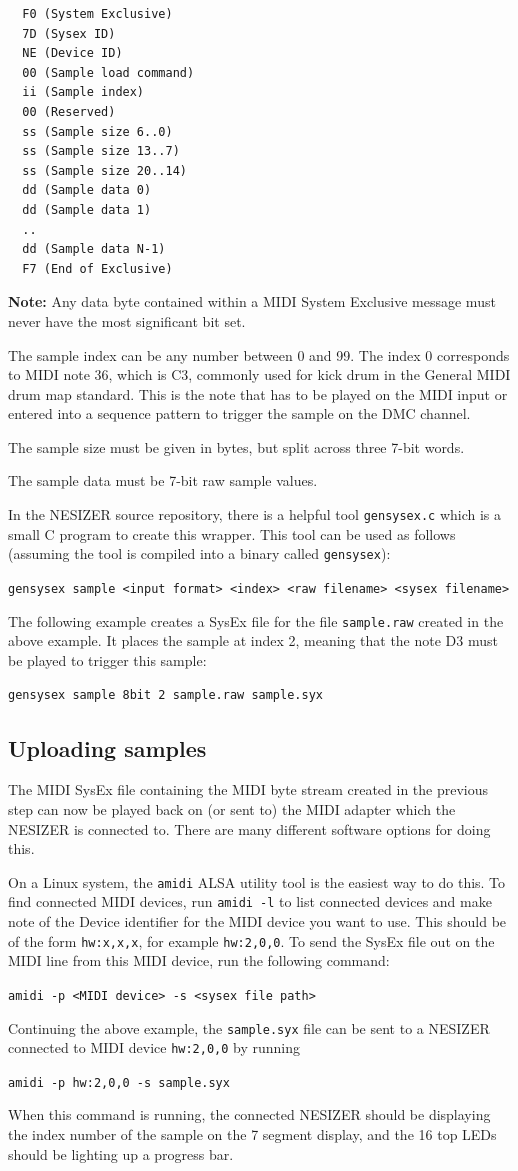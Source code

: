 \documentclass[a4paper, 12p]{extarticle}
\begin{document}
\begin{verbatim}
  F0 (System Exclusive)
  7D (Sysex ID)
  NE (Device ID)
  00 (Sample load command)
  ii (Sample index)
  00 (Reserved)
  ss (Sample size 6..0)
  ss (Sample size 13..7)
  ss (Sample size 20..14)
  dd (Sample data 0)
  dd (Sample data 1)
  ..
  dd (Sample data N-1)
  F7 (End of Exclusive)
\end{verbatim}

\textbf{Note:} Any data byte contained within a MIDI System Exclusive message must never have the most significant bit set.

The sample index can be any number between 0 and 99. The index 0 corresponds to MIDI note 36, which is C3, commonly used for kick drum in the General MIDI drum map standard. This is the note that has to be played on the MIDI input or entered into a sequence pattern to trigger the sample on the DMC channel.

The sample size must be given in bytes, but split across three 7-bit words.

The sample data must be 7-bit raw sample values.

In the NESIZER source repository, there is a helpful tool \verb+gensysex.c+ which is a small C program to create this wrapper. This tool can be used as follows (assuming the tool is compiled into a binary called \verb+gensysex+):

\verb+gensysex sample <input format> <index> <raw filename> <sysex filename>+

The following example creates a SysEx file for the file \verb+sample.raw+ created in the above example. It places the sample at index 2, meaning that the note D3 must be played to trigger this sample:

\verb+gensysex sample 8bit 2 sample.raw sample.syx+

\subsection{Uploading samples}
The MIDI SysEx file containing the MIDI byte stream created in the previous step can now be played back on (or sent to) the MIDI adapter which the NESIZER is connected to. There are many different software options for doing this.

On a Linux system, the \verb+amidi+ ALSA utility tool is the easiest way to do this. To find connected MIDI devices, run \verb+amidi -l+ to list connected devices and make note of the Device identifier for the MIDI device you want to use. This should be of the form \verb+hw:x,x,x+, for example \verb+hw:2,0,0+.
To send the SysEx file out on the MIDI line from this MIDI device, run the following command:

\verb+amidi -p <MIDI device> -s <sysex file path>+

Continuing the above example, the \verb+sample.syx+ file can be sent to a NESIZER connected to MIDI device \verb+hw:2,0,0+ by running

\verb+amidi -p hw:2,0,0 -s sample.syx+

When this command is running, the connected NESIZER should be displaying the index number of the sample on the 7 segment display, and the 16 top LEDs should be lighting up a progress bar.
\end{document}
